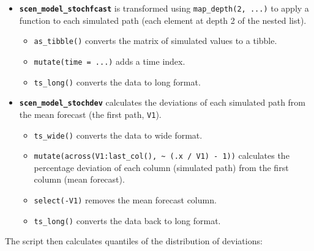 \documentclass[
  letterpaper,
  DIV=11,
  numbers=noendperiod]{scrreport}
\providecommand{\tightlist}{%
  \setlength{\itemsep}{0pt}\setlength{\parskip}{0pt}}\usepackage{longtable,booktabs,array}
\begin{document}
\begin{itemize}
\tightlist
\item
  \textbf{\texttt{scen\_model\_stochfcast}} is transformed using
  \texttt{map\_depth(2,\ ...)} to apply a function to each simulated
  path (each element at depth 2 of the nested list).

  \begin{itemize}
  \tightlist
  \item
    \texttt{as\_tibble()} converts the matrix of simulated values to a
    tibble.
  \item
    \texttt{mutate(time\ =\ ...)} adds a time index.
  \item
    \texttt{ts\_long()} converts the data to long format.
  \end{itemize}
\item
  \textbf{\texttt{scen\_model\_stochdev}} calculates the deviations of
  each simulated path from the mean forecast (the first path,
  \texttt{V1}).

  \begin{itemize}
  \tightlist
  \item
    \texttt{ts\_wide()} converts the data to wide format.
  \item
    \texttt{mutate(across(V1:last\_col(),\ \textasciitilde{}\ (.x\ /\ V1)\ -\ 1))}
    calculates the percentage deviation of each column (simulated path)
    from the first column (mean forecast).
  \item
    \texttt{select(-V1)} removes the mean forecast column.
  \item
    \texttt{ts\_long()} converts the data back to long format.
  \end{itemize}
\end{itemize}

The script then calculates quantiles of the distribution of deviations:
\end{document}
